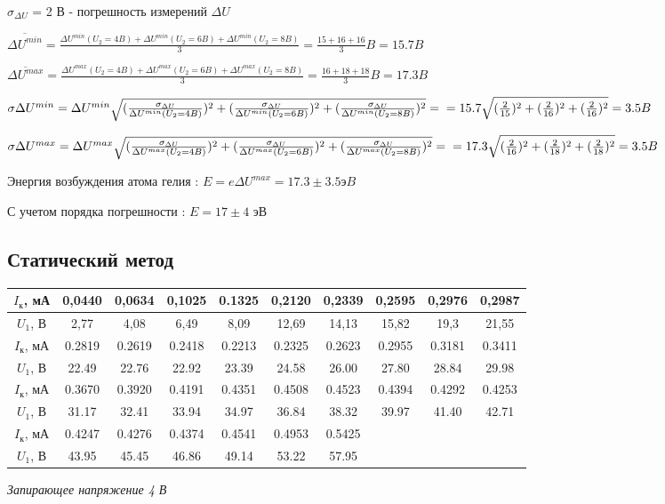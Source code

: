 \documentclass[12pt,a4paper]{article}
\begin{document}
\begin{large}
 $\sigma_{\Delta U}$ = 2 В - погрешность измерений $\Delta U$\hfill\break
 
 $\overline{\Delta{U}^{min}} = \frac{\Delta{U}^{min}(U_2 = 4B) + \Delta{U}^{min}(U_2 = 6B) + \Delta{U}^{min}(U_2 = 8B)}{3} = \frac{15 + 16 + 16}{3}B = 15.7 B$ 

$\overline{\Delta{U}^{max}} = \frac{\Delta{U}^{max}(U_2 = 4B) + \Delta{U}^{max}(U_2 = 6B) + \Delta{U}^{max}(U_2 = 8B)}{3} = \frac{16 + 18 + 18}{3}B = 17.3 B$ 

$\sigma \Delta{U}^{min} = \Delta{U}^{min}\sqrt{(\frac{\sigma_{\Delta U}}{\Delta{U}^{min}(U_2 = 4B)})^2 + (\frac{\sigma_{\Delta U}}{\Delta{U}^{min}(U_2 = 6B)})^2 + (\frac{\sigma_{\Delta U}}{\Delta{U}^{min}(U_2 = 8B)})^2} =
\newline
 =15.7\sqrt{(\frac{2}{15})^2 + (\frac{2}{16})^2 + (\frac{2}{16})^2} = 3.5B$

$\sigma \Delta{U}^{max} = \Delta{U}^{max}\sqrt{(\frac{\sigma_{\Delta U}}{\Delta{U}^{max}(U_2 = 4B)})^2 + (\frac{\sigma_{\Delta U}}{\Delta{U}^{max}(U_2 = 6B)})^2 + (\frac{\sigma_{\Delta U}}{\Delta{U}^{max}(U_2 = 8B)})^2} =
\newline
 =17.3\sqrt{(\frac{2}{16})^2 + (\frac{2}{18})^2 + (\frac{2}{18})^2} = 3.5B$
\end{large}

Энергия возбуждения атома гелия : \large{$E = e \Delta{U}^{max} = 17.3 \pm 3.5 эB$}

С учетом порядка погрешности : \large{$E = 17 \pm 4$ эВ}

\subsection{Статический метод}


\begin{tabular}{|c|c|c|c|c|c|c|c|c|c|}
\hline 
$I_\text{к}$, мА & 0,0440 & 0,0634 & 0,1025 & 0.1325 & 0,2120 & 0,2339 & 0,2595 & 0,2976 & 0,2987 \\ 
\hline 
$U_1$, В & 2,77 & 4,08 & 6,49 & 8,09 & 12,69 & 14,13 & 15,82 & 19,3 & 21,55 \\ 
\hline 
$I_\text{к}$, мА & 0.2819 & 0.2619 & 0.2418 & 0.2213 & 0.2325 & 0.2623 & 0.2955 & 0.3181 & 0.3411 \\ 
\hline 
$U_1$, В & 22.49 & 22.76 & 22.92 & 23.39 & 24.58 & 26.00 & 27.80 & 28.84 & 29.98 \\ 
\hline
$I_\text{к}$, мА & 0.3670 & 0.3920 & 0.4191 & 0.4351 & 0.4508 &0.4523 & 0.4394 & 0.4292 & 0.4253 \\
\hline
$U_1$, В & 31.17 & 32.41 & 33.94 & 34.97 & 36.84 & 38.32 & 39.97 & 41.40 & 42.71 \\
\hline 
$I_\text{к}$, мА & 0.4247 & 0.4276 & 0.4374 & 0.4541 & 0.4953 & 0.5425 & & & \\
\hline
$U_1$, В & 43.95 & 45.45 & 46.86 & 49.14 & 53.22 & 57.95 & & & \\
\hline
\end{tabular} 
\begin{center}
\textit{Запирающее напряжение 4 В}
\end{center}
\end{document}
